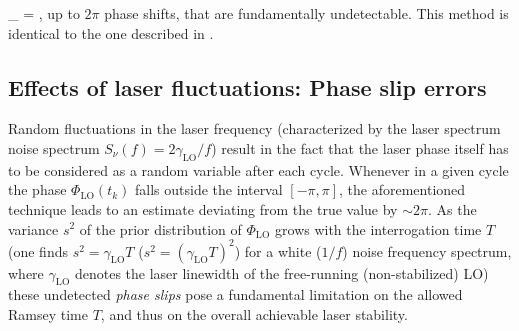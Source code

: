 \bel
	\label{eq:Projection}
	_ = ,
\eel
up to $2\pi$ phase shifts, that are fundamentally undetectable.
This method is identical to the one described in \cite{Rosenband2013}.


\subsection{Effects of laser fluctuations: Phase slip errors}
Random fluctuations in the laser frequency (characterized by the laser spectrum noise spectrum $S_\nu(f) = {2\gamma_\mathrm{LO}}/{f}$) result in the fact that the laser phase itself has to be considered as a random variable after each cycle. 
 Whenever in a given cycle the phase $\Phi_\mathrm{LO}(t_k)$ falls outside the
 interval $[-\pi,\pi]$, the aforementioned technique leads to an estimate deviating from the true value by $\sim2\pi$. As the variance $s^2$ of the prior distribution of  $\Phi_\mathrm{LO}$ grows with the interrogation time $T$ (one finds $s^2= \gamma_\mathrm{LO}T$ ($s^2= (\gamma_\mathrm{LO}T)^2$) for a white ($1/f$) noise frequency spectrum, where $\gamma_\mathrm{LO}$ denotes the laser linewidth of the free-running
(non-stabilized) LO) these undetected \textit{phase slips} pose a fundamental limitation on the allowed Ramsey time $T$, and thus on the overall achievable laser stability.

